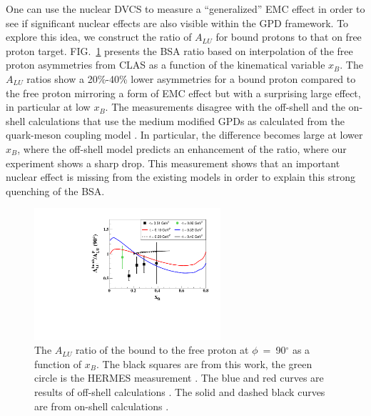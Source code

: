 \documentclass[twocolumn,nofootinbib,showpacs,prl,superscriptaddress,secnumarabic,amssymb,nobibnotes,aps,floatfix]{revtex4}
\begin{document}
One can use the nuclear DVCS to measure a ``generalized'' EMC effect in order 
to see if significant nuclear effects are also visible within the GPD framework. 
To explore this idea, we construct 
the ratio of $A_{LU}$ for bound protons to that on free proton target.  
FIG.~\ref{fig:incoh_EMC_ratio_ALU_proton} presents the 
BSA ratio based on interpolation of the free proton asymmetries from  
CLAS \cite{Girod:2007aa} as a function of the kinematical variable
$x_B$. The $A_{LU}$ ratios show a 20\%-40\% lower asymmetries for a bound proton compared 
to the free proton mirroring a form of EMC effect but with a surprising 
large effect, in particular at low $x_B$. The measurements disagree with the off-shell \cite{simonetta_2} 
and the on-shell calculations that use the medium modified GPDs as calculated from 
the quark-meson coupling model \cite{Guzey:2008fe}. In particular, the difference becomes
large at lower $x_B$, 
where the off-shell model predicts an enhancement of the ratio, where our experiment 
shows a sharp drop. This measurement shows that an important nuclear effect is
missing from the existing models in order to explain this strong quenching of
the BSA.

\begin{figure}[tb]
\centering
\includegraphics[width=6.9cm]{figs/ALU_ratioInc_x_shortscenrario.pdf}
\caption{ The $A_{LU}$ ratio of the bound to the free proton at 
   $\phi$~=~90$^{\circ}$ as a function of $x_B$. The black squares are from this 
   work, the green circle is the HERMES measurement 
   \cite{Airapetian:2009cga}. The blue and red curves are results of off-shell 
   calculations \cite{simonetta_2}. The solid and dashed black curves are from 
   on-shell calculations \cite{Guzey:2008fe}.} 
   \label{fig:incoh_EMC_ratio_ALU_proton}
\end{figure}
\end{document}
